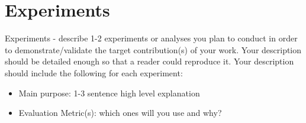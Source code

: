 \section{Experiments}

Experiments - describe 1-2 experiments or analyses you plan to conduct in order to demonstrate/validate the target contribution(s) of your work. Your description should be detailed enough so that a reader could reproduce it. Your description should include the following for each experiment:
\begin{itemize}
    \item Main purpose: 1-3 sentence high level explanation
    \item Evaluation Metric(s): which ones will you use and why?
\end{itemize}

